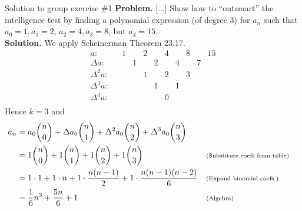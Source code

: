 \documentclass[10pt]{beamer}
\begin{document}
\begin{frame}{Solution to group exercise \#1}
\small 
\textbf{Problem.} [...] Show how to \enquote{outsmart} the intelligence test by finding a polynomial expression (of degree 3) for $a_n$ such that $a_0=1, a_1=2$, $a_2=4, a_3=8$, but $a_4=15$. \\
\vfill 
\textbf{Solution.} We apply Scheinerman Theorem 23.17.
\vspace{-.25cm}
\[
\begin{array}{ccccccccccc}
a:& & 1 &     & 2 &     & 4 &     & 8 &  &15 \\
\Delta a:& &  & 1    &  & 2    &  &  4   &  & 7  & \\
\Delta^2 a:& &  &     & 1 &     & 2 &     &  3 &   & \\
\Delta^3 a:& &  &     &  &  1   & &   1  &   &   & \\
\Delta^4 a:& &  &     &  &     & 0 &     &   &   & \\
\end{array}
\]
Hence $k=3$ and 
%
\begin{align*}
a_n &= a_0 \binom{n}{0} +	\Delta a_0 \binom{n}{1} + 		\Delta^2 a_0 \binom{n}{2} + 		\Delta^3 a_0 \binom{n}{3} \\
&= 1 \binom{n}{0} +	1  \binom{n}{1} + 		1 \binom{n}{2} + 		1 \binom{n}{3} && \text{\scriptsize{{(Substitute coefs from table)}}} \\
&= 1 \cdot 1 +	1 \cdot n  + 		1 \cdot \frac{n (n-1)}{2} + 		1 \cdot \frac{n (n-1) (n-2)}{6} && \text{\scriptsize{{(Expand binomial coefs.)}}} \\
&= \frac{1}{6} n^3 + \frac{5n}{6} + 1 && \text{\scriptsize{{(Algebra)}}}
\end{align*}


\end{frame}
\end{document}
